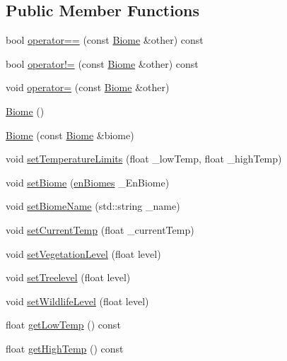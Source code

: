 \subsection*{Public Member Functions}
\begin{DoxyCompactItemize}
\item 
bool \mbox{\hyperlink{class_biome_ab30d25f0400f31071794964de3224b6b}{operator==}} (const \mbox{\hyperlink{class_biome}{Biome}} \&other) const
\item 
bool \mbox{\hyperlink{class_biome_a5f619965ed1bf4b1f7423cbb69be3559}{operator!=}} (const \mbox{\hyperlink{class_biome}{Biome}} \&other) const
\item 
void \mbox{\hyperlink{class_biome_a5a66500c836cefef0f6cf47af93fe3df}{operator=}} (const \mbox{\hyperlink{class_biome}{Biome}} \&other)
\item 
\mbox{\hyperlink{class_biome_aa340fc9737f1f60fe4aa99f5d4d5c726}{Biome}} ()
\item 
\mbox{\hyperlink{class_biome_a6145de7d30bcbef4b6042ee456f88f16}{Biome}} (const \mbox{\hyperlink{class_biome}{Biome}} \&biome)
\item 
void \mbox{\hyperlink{class_biome_acc568302ef1e66d443d2e43d94b36a10}{set\+Temperature\+Limits}} (float \+\_\+low\+Temp, float \+\_\+high\+Temp)
\item 
void \mbox{\hyperlink{class_biome_afb3047918646d9d7717b74091efa378b}{set\+Biome}} (\mbox{\hyperlink{_enum_types_8hpp_a5c2255009cd01c90cf68245e6f453d1c}{en\+Biomes}} \+\_\+\+En\+Biome)
\item 
void \mbox{\hyperlink{class_biome_a4b702cd936eb35364493be9e3e3c4166}{set\+Biome\+Name}} (std\+::string \+\_\+name)
\item 
void \mbox{\hyperlink{class_biome_a73164a278cfd1c3c6cf52a6b006034e0}{set\+Current\+Temp}} (float \+\_\+current\+Temp)
\item 
void \mbox{\hyperlink{class_biome_adbe071450d7411ddd3f886b1c84c2029}{set\+Vegetation\+Level}} (float level)
\item 
void \mbox{\hyperlink{class_biome_adb9f34f853f233464a33a5dfbb2ccbee}{set\+Treelevel}} (float level)
\item 
void \mbox{\hyperlink{class_biome_afe05b01787008c396ccad3ffd7e6d6cd}{set\+Wildlife\+Level}} (float level)
\item 
float \mbox{\hyperlink{class_biome_afd3fa2df745d92eb95aaf8b58d119ca5}{get\+Low\+Temp}} () const
\item 
float \mbox{\hyperlink{class_biome_aee5574622d28c0bb3b91eece705252c4}{get\+High\+Temp}} () const

\end{DoxyCompactItemize}

